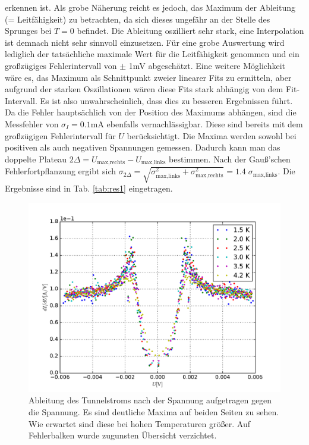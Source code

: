 \documentclass[twoside,        %
               BCOR12mm,       %
               english,ngerman, %
               fleqn,headsepline=false,footsepline=false
              ]{Vorlage/MFPREPORT}
\begin{document}
erkennen ist. Als grobe Näherung reicht es jedoch, das Maximum der Ableitung
(= Leitfähigkeit) zu
betrachten, da sich dieses ungefähr an der Stelle des Sprunges bei $T=0$
befindet. Die Ableitung oszilliert sehr stark, eine Interpolation ist demnach
nicht sehr sinnvoll einzusetzen. Für eine grobe Auswertung wird lediglich der
tatsächliche maximale Wert für die Leitfähigkeit genommen und ein großzügiges
Fehlerintervall von $\pm$ 1\;mV abgeschätzt. Eine weitere Möglichkeit wäre es,
das Maximum als Schnittpunkt zweier linearer Fits zu ermitteln, aber aufgrund
der starken Oszillationen wären diese Fits stark abhängig von dem
Fit-Intervall. Es ist also unwahrscheinlich, dass dies zu besseren Ergebnissen
führt. Da die Fehler hauptsächlich von der Position des Maximums abhängen, sind
die Messfehler von $\sigma_I=0.1$\;mA ebenfalls vernachlässigbar. Diese sind
bereits mit dem großzügigen Fehlerintervall für $U$ berücksichtigt. Die Maxima
werden sowohl bei positiven als auch negativen Spannungen gemessen. Dadurch
kann man das doppelte Plateau $2\Delta=U_{\text{max,rechts}}-U_{\text{max,links}}$ bestimmen.
Nach der Gauß'schen Fehlerfortpflanzung ergibt sich
$\sigma_{2\Delta}=\sqrt{\sigma_{\text{max,links}}^2+\sigma_{\text{max,rechts}}^2}=1.4\;\sigma_{\text{max,links}}$.
Die Ergebnisse sind in Tab. \ref{tab:res1} eingetragen.
\begin{figure}[h]
    \centering
    \includegraphics[width=\textwidth]{fig/3.pdf}
    \caption{Ableitung des Tunnelstroms nach der Spannung aufgetragen gegen die
 Spannung. Es sind deutliche Maxima auf beiden Seiten zu sehen. Wie erwartet
 sind diese bei hohen Temperaturen größer. Auf Fehlerbalken wurde zugunsten
 Übersicht verzichtet. }
    \label{fig:3}
\end{figure}
\end{document}
